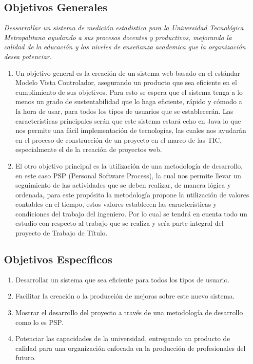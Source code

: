 \documentclass[a4paper,12pt,openany,oneside]{book}
\begin{document}
\subsection{Objetivos Generales}
\textit{Dessarrollar un sistema de medición estadistica para la Universidad Tecnológica Metropolitana ayudando a sus procesos docentes y productivos, mejorando la calidad de la educación y los niveles de enseñanza academica que la organización desea potenciar.}
\begin{enumerate}
\item Un objetivo general es la creación de un sistema web basado en el estándar Modelo Vista Controlador, asegurando un producto que sea eficiente en el cumplimiento de sus objetivos. Para esto se espera que el sistema tenga a lo menos un grado de sustentabilidad que lo haga eficiente, rápido y cómodo a la hora de usar, para todos los tipos de usuarios que se establecerán. Las características principales serán que este sistema estará echo en Java lo que nos permite una fácil implementación de tecnologías, las cuales nos ayudarán en el proceso de construcción de un proyecto en el marco de las TIC, especialmente el de la creación de proyectos web.
\item El otro objetivo principal es la utilización de una metodología de desarrollo, en este caso PSP (Personal Software Process), la cual nos permite llevar un seguimiento de las actividades que se deben realizar, de manera lógica y ordenada, para este propósito la metodología propone la utilización de valores contables en el tiempo, estos valores establecen las características y condiciones del trabajo del ingeniero. Por lo cual se tendrá en cuenta todo un estudio con respecto al trabajo que se realiza y seŕa parte integral del proyecto de Trabajo de Título.
\end{enumerate}
\subsection{Objetivos Específicos}
\begin{enumerate}
	\item Desarrollar un sistema que sea eficiente para todos los tipos de usuario.
	\item Facilitar la creación o la producción de mejoras sobre este nuevo sistema.
	\item Mostrar el desarrollo del proyecto a través de una metodología de desarrollo como lo es PSP.
	\item Potenciar las capacidades de la universidad, entregando un producto de calidad para una organización enfocada en la producción de profesionales del futuro.
\end{enumerate}
\end{document}

